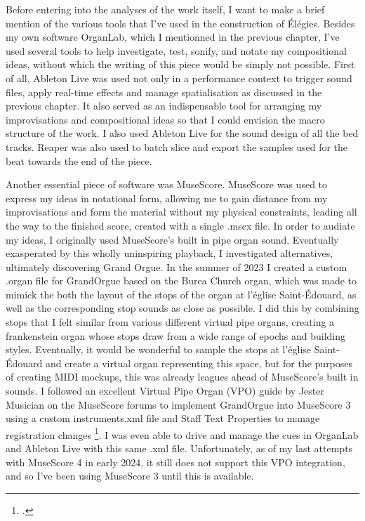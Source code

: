 \documentclass[12pt,twoside,maitrise]{dms_ks}
\theoremstyle{definition}
\begin{document}
Before entering into the analyses of the work itself, I want to make a brief mention of the various tools that I've used in the construction of Élégies. 
Besides my own software OrganLab, which I mentionned in the previous chapter, I've used several tools to help investigate, test, sonify, and notate my compositional ideas, without which the writing of this piece would be simply not possible. 
First of all, Ableton Live was used not only in a performance context to trigger sound files, apply real-time effects and manage spatialisation as discussed in the previous chapter. 
It also served as an indispensable tool for arranging my improvisations and compositional ideas so that I could envision the macro structure of the work. 
I also used Ableton Live for the sound design of all the bed tracks. 
Reaper was also used to batch slice and export the samples used for the beat towards the end of the piece.

Another essential piece of software was MuseScore. 
MuseScore was used to express my ideas in notational form, allowing me to gain distance from my improvisations and form the material without my physical constraints, leading all the way to the finished score, created with a single .mscx file. 
In order to audiate my ideas, I originally used MuseScore's built in pipe organ sound. 
Eventually exasperated by this wholly uninspiring playback, I investigated alternatives, ultimately discovering Grand Orgue. 
In the summer of 2023 I created a custom .organ file for GrandOrgue based on the Burea Church organ, which was made to mimick the both the layout of the stops of the organ at l'église Saint-Édouard, as well as the corresponding stop sounds as close as possible. 
I did this by combining stops that I felt similar from various different virtual pipe organs, creating a frankenstein organ whose stops draw from a wide range of epochs and building styles. 
Eventually, it would be wonderful to sample the stops at l'église Saint-Édouard and create a virtual organ representing this space, but for the purposes of creating MIDI mockups, this was already leagues ahead of MuseScore's built in sounds. 
I followed an excellent Virtual Pipe Organ (VPO) guide by Jester Musician on the MuseScore forums to implement GrandOrgue into MuseScore 3 using a custom instruments.xml file and Staff Text Properties to manage registration changes \footcite{musician_jester_how_2018}. 
I was even able to drive and manage the cues in OrganLab and Ableton Live with this same .xml file. 
Unfortunately, as of my last attempts with MuseScore 4 in early 2024, it still does not support this VPO integration, and so I've been using MuseScore 3 until this is available.
\end{document}
